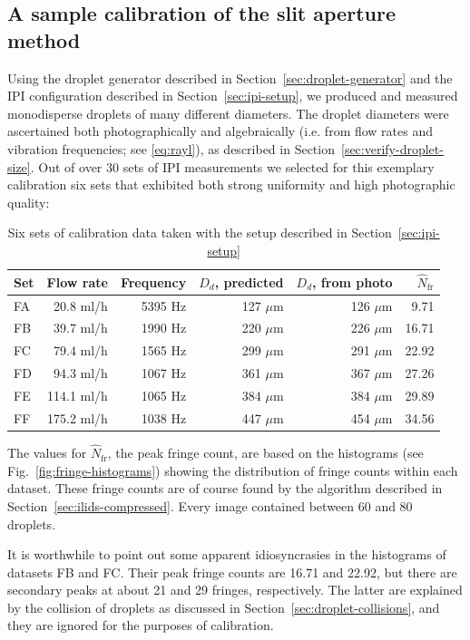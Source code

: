 \documentclass[11.5pt,oneside]{book}
\newcommand*{\figref}[1]{Fig.~\ref{#1}}
\newcommand*{\secref}[1]{Section~\ref{#1}}
\begin{document}
\subsection{A sample calibration of the slit aperture method
\label{sec:ilids-calibration}}
Using the droplet generator described in \secref{sec:droplet-generator} and
the IPI configuration described in \secref{sec:ipi-setup}, we produced and
measured monodisperse droplets of many different diameters. The droplet
diameters were ascertained both photographically and algebraically (i.e. from
flow rates and vibration frequencies; see \eqref{eq:rayl}), as described
in \secref{sec:verify-droplet-size}. Out of over 30 sets of IPI
measurements we selected for this exemplary calibration six sets that
exhibited both strong uniformity and high photographic quality:

\begin{table}[h!]
    \centering
    \begin{tabular}{lrrrrr}
    \toprule
    Set & Flow rate & Frequency & $D_d$, predicted  & $D_d$, from
photo & $\hat{N}_\text{fr}$ \\
    \midrule
    FA & 20.8  ml/h  & 5395 Hz  & 127 $\mu$m  & 126 $\mu$m &  9.71      \\
    FB & 39.7  ml/h  & 1990 Hz  & 220 $\mu$m  & 226 $\mu$m &  16.71     \\
    FC & 79.4  ml/h  & 1565 Hz  & 299 $\mu$m  & 291 $\mu$m &  22.92     \\
    FD & 94.3  ml/h  & 1067 Hz  & 361 $\mu$m  & 367 $\mu$m &  27.26     \\
    FE & 114.1 ml/h  & 1065 Hz  & 384 $\mu$m  & 384 $\mu$m &  29.89     \\
    FF & 175.2 ml/h  & 1038 Hz  & 447 $\mu$m  & 454 $\mu$m &  34.56     \\
    \bottomrule
\end{tabular}
\caption{Six sets of calibration data taken with the setup described in \secref{sec:ipi-setup}}
\label{tab:ipi-calibration-datasets}
\end{table}
The values for $\hat{N}_\text{fr}$, the peak fringe count, are based on the
histograms (see \figref{fig:fringe-histograms}) showing the distribution of
fringe counts within each dataset. These fringe counts are of course found by
the algorithm described in \secref{sec:ilids-compressed}. Every image contained
between 60 and 80 droplets.

It is worthwhile to point out some apparent idiosyncrasies in the histograms of
datasets FB and FC. Their peak fringe counts are 16.71 and 22.92, but there are
secondary peaks at about 21 and 29 fringes, respectively. The latter are
explained by the collision of droplets as discussed in
\secref{sec:droplet-collisions}, and they are ignored for the purposes of
calibration.
\end{document}
